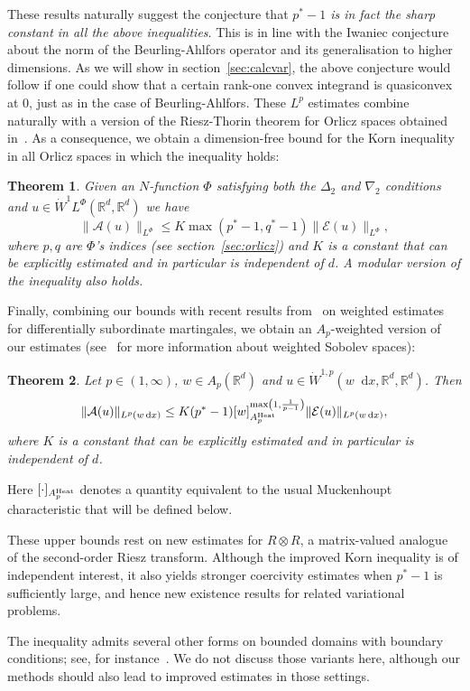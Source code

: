 \documentclass[11pt, a4paper]{amsart}
\newtheorem{theorem}{Theorem}[section]
\theoremstyle{definition}
\theoremstyle{remark}
\newcommand{\R}{\mathbb{R}}
\newcommand*\diff{\mathop{}\!\mathrm{d}}
\begin{document}
These results naturally suggest the conjecture
that \emph{$p^*-1$ is in fact the sharp constant
in all the above inequalities}. This
is in line with the Iwaniec conjecture
about the norm of 
the Beurling-Ahlfors operator
and its generalisation to higher dimensions.
As we will show in section~\ref{sec:calcvar},
the above conjecture would follow if one could show
that a certain rank-one convex integrand
is quasiconvex at $0$, just as in the
case of Beurling-Ahlfors.
These $L^p$ estimates combine naturally
with a version of the Riesz-Thorin
theorem for Orlicz spaces obtained
in~\cite{RieszThorinOrlicz}.
As a consequence, we obtain a dimension-free
bound for the Korn
inequality in all Orlicz spaces
in which the inequality holds:
\begin{theorem}\label{thm:KornOrlicz}
Given an $N$-function $\Phi$ satisfying
both the $\Delta_2$
and $\nabla_2$ conditions
and $u\in \dot{W}^1L^\Phi(\R^d, \R^d)$ we have
\begin{equation*}
\|\mathcal A(u)\|_{L^\Phi}\le
K \max(p^*-1,q^*-1)\|\mathcal E(u)\|_{L^\Phi},
\end{equation*}
where $p,q$ are $\Phi$'s indices
(see section~\ref{sec:orlicz})
and $K$ is a constant that can be explicitly estimated
and in particular is independent of $d$.
A modular version
of the inequality also holds.
\end{theorem}
Finally, combining our bounds with
recent results from~\cite{Petermichl}
on weighted estimates for
differentially subordinate martingales,
we obtain an $A_p$-weighted version of our estimates
(see~\cite{Kilpelainen1994} for more
information about weighted Sobolev spaces):
\begin{theorem}\label{thm:Kornweighted}
Let $p\in (1,\infty)$, $w\in A_p(\R^d)$ and 
$u\in \dot{W}^{1,p}(w\diff x, \R^d,\R^d)$.
Then
\begin{equation*}
    \|\mathcal A(u)\|_{L^p(w\diff x)}
    \le K (p^*-1)
    [w]_{A_p^\text{\upshape Heat}}^
    {\max\left(1,\frac1{p-1}\right)}
    \|\mathcal E(u)\|_{L^p(w\diff x)},
\end{equation*}
where $K$ is a constant that can be explicitly estimated
and in particular is independent of $d$.
\end{theorem}
Here $[\cdot]_{A_p^{\text{\upshape Heat}}}$ denotes
a quantity equivalent to the usual
Muckenhoupt characteristic
that will be defined below.\par
These upper bounds rest on new estimates for $R\otimes 
R$, a matrix-valued analogue of the second-order 
Riesz transform.
Although the improved Korn inequality
is of independent interest,
it also yields stronger
coercivity estimates when $p^*-1$ is sufficiently large,
and hence new existence results
for related variational problems.\par
The inequality admits several other forms
on bounded domains with
boundary conditions; see, for instance~\cite{payne1961korn}.
We do not discuss those variants here,
although our methods should also lead to improved
estimates in those settings.\par
\end{document}
